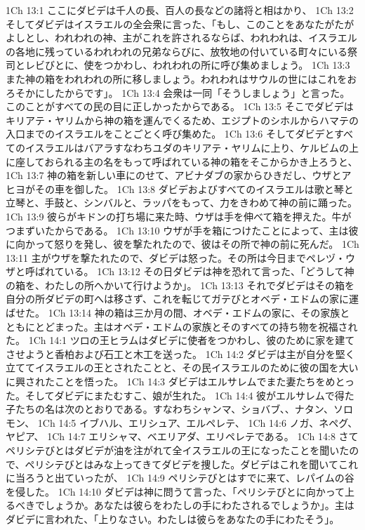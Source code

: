 1Ch 13:1  ここにダビデは千人の長、百人の長などの諸将と相はかり、
1Ch 13:2  そしてダビデはイスラエルの全会衆に言った、「もし、このことをあなたがたがよしとし、われわれの神、主がこれを許されるならば、われわれは、イスラエルの各地に残っているわれわれの兄弟ならびに、放牧地の付いている町々にいる祭司とレビびとに、使をつかわし、われわれの所に呼び集めましょう。
1Ch 13:3  また神の箱をわれわれの所に移しましょう。われわれはサウルの世にはこれをおろそかにしたからです」。
1Ch 13:4  会衆は一同「そうしましょう」と言った。このことがすべての民の目に正しかったからである。
1Ch 13:5  そこでダビデはキリアテ・ヤリムから神の箱を運んでくるため、エジプトのシホルからハマテの入口までのイスラエルをことごとく呼び集めた。
1Ch 13:6  そしてダビデとすべてのイスラエルはバアラすなわちユダのキリアテ・ヤリムに上り、ケルビムの上に座しておられる主の名をもって呼ばれている神の箱をそこからかき上ろうと、
1Ch 13:7  神の箱を新しい車にのせて、アビナダブの家からひきだし、ウザとアヒヨがその車を御した。
1Ch 13:8  ダビデおよびすべてのイスラエルは歌と琴と立琴と、手鼓と、シンバルと、ラッパをもって、力をきわめて神の前に踊った。
1Ch 13:9  彼らがキドンの打ち場に来た時、ウザは手を伸べて箱を押えた。牛がつまずいたからである。
1Ch 13:10  ウザが手を箱につけたことによって、主は彼に向かって怒りを発し、彼を撃たれたので、彼はその所で神の前に死んだ。
1Ch 13:11  主がウザを撃たれたので、ダビデは怒った。その所は今日までペレヅ・ウザと呼ばれている。
1Ch 13:12  その日ダビデは神を恐れて言った、「どうして神の箱を、わたしの所へかいて行けようか」。
1Ch 13:13  それでダビデはその箱を自分の所ダビデの町へは移さず、これを転じてガテびとオベデ・エドムの家に運ばせた。
1Ch 13:14  神の箱は三か月の間、オベデ・エドムの家に、その家族とともにとどまった。主はオベデ・エドムの家族とそのすべての持ち物を祝福された。
1Ch 14:1  ツロの王ヒラムはダビデに使者をつかわし、彼のために家を建てさせようと香柏および石工と木工を送った。
1Ch 14:2  ダビデは主が自分を堅く立ててイスラエルの王とされたことと、その民イスラエルのために彼の国を大いに興されたことを悟った。
1Ch 14:3  ダビデはエルサレムでまた妻たちをめとった。そしてダビデにまたむすこ、娘が生れた。
1Ch 14:4  彼がエルサレムで得た子たちの名は次のとおりである。すなわちシャンマ、ショバブ、、ナタン、ソロモン、
1Ch 14:5  イブハル、エリシュア、エルペレテ、
1Ch 14:6  ノガ、ネペグ、ヤピア、
1Ch 14:7  エリシャマ、ベエリアダ、エリペレテである。
1Ch 14:8  さてペリシテびとはダビデが油を注がれて全イスラエルの王になったことを聞いたので、ペリシテびとはみな上ってきてダビデを捜した。ダビデはこれを聞いてこれに当ろうと出ていったが、
1Ch 14:9  ペリシテびとはすでに来て、レパイムの谷を侵した。
1Ch 14:10  ダビデは神に問うて言った、「ペリシテびとに向かって上るべきでしょうか。あなたは彼らをわたしの手にわたされるでしょうか」。主はダビデに言われた、「上りなさい。わたしは彼らをあなたの手にわたそう」。
